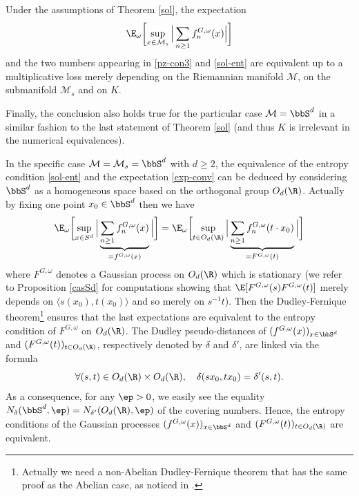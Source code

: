 \begin{theo}\label{sol-q}
Under the assumptions of Theorem \ref{sol}, the expectation \begin{equation*}
\E_{\omega}\biggl[\sup_{x\in\mathcal{M}_s}\Big| \sum_{n\geq 1} f_n^{G,\omega}(x)\Big|\biggr]
\end{equation*} and the two numbers appearing in \eqref{pz-con3} and \eqref{sol-ent} are equivalent up to a multiplicative loss merely depending on the Riemannian manifold $\mathcal{M}$, on the submanifold $\mathcal{M}_s$ and on $K$.

Finally, the conclusion also holds true for the particular case $\mathcal{M}=\bbS^d$ in a similar fashion to the last statement of Theorem \ref{sol} (and thus $K$ is irrelevant in the numerical equivalences).
\end{theo}
In the specific case $\mathcal{M}=\mathcal{M}_s=\bbS^d$ with $d\geq 2$, the equivalence of the entropy condition \eqref{sol-ent} and the expectation \eqref{exp-conv} can be deduced by considering $\bbS^d$ as a homo\-geneous space based on the orthogonal group $O_d(\R)$. Actually by fixing one point $x_0\in \bbS^d$ then we have
\begin{equation*}
\E_{\omega}\biggl[\sup_{x\in S^d}\Big| \underbrace{\sum_{n\geq 1} f_n^{G,\omega}(x)}_{=f^{G,\omega}(x)}\Big|\biggr]=
\E_{\omega}\biggl[\sup_{t\in O_d(\R)}\Big| \underbrace{\sum_{n\geq 1} f_n^{G,\omega}(t\cdot x_0)}_{=F^{G,\omega}(t)}\Big|\biggr]
\end{equation*}
where $F^{G,\omega}$ denotes a Gaussian process on $O_d(\R)$ which is stationary (we refer to Proposition \ref{casSd} for computations showing that $\E[F^{G,\omega}(s)F^{G,\omega}(t)]$ merely depends on $\langle s (x_0), t (x_0)\rangle$ and so merely on $s^{-1}t$).
Then the Dudley-Fernique theorem\footnote{Actually we need a non-Abelian Dudley-Fernique theorem that has the same proof as the Abelian case, as noticed in \cite[p.\,96]{pisier1981}.} ensures that the last expectations are equivalent to the entropy condition of $F^{G,\omega}$ on $O_d(\R)$. The Dudley pseudo-distances of $(f^{G,\omega}(x))_{x\in \bbS^d}$ and $(F^{G,\omega}(t))_{t\in O_d(\R)}$, respectively denoted by $\delta$ and $\delta'$, are linked via the formula
\begin{equation*}
\forall (s,t)\in O_d(\R)\times O_d(\R), \quad \delta(s x_0, t x_0) = \delta'(s,t).
\end{equation*}
As a consequence, for any $\ep>0$, we easily see the equality $N_\delta(\bbS^d,\ep)=N_{\delta'}(O_d(\R),\ep)$ of the covering numbers. Hence, the entropy conditions of the Gaussian processes
$(f^{G,\omega}(x))_{x\in \bbS^d}$ and $(F^{G,\omega}(t))_{t\in O_d(\R)}$ are equivalent.

